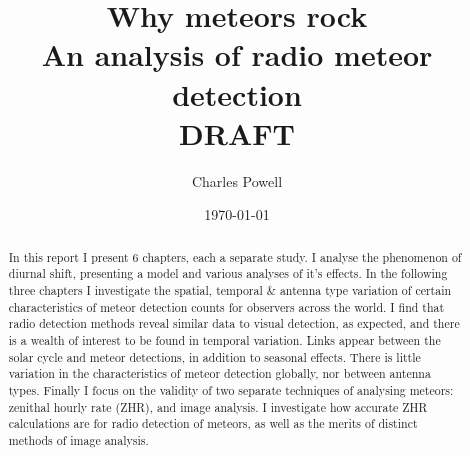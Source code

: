 \documentclass[a4paper,10pt,notitlepage, twocolumn]{report}
\title{\huge Why meteors rock \\ \large An analysis of radio meteor detection \\ \vspace{1em} \huge {\bf DRAFT}}
\author{Charles Powell}
\begin{document}
	

\begin{titlingpage}
\date{\today}
\maketitle

\vspace{10em}
\begin{abstract}
	In this report I present 6 chapters, each a separate study. I analyse the phenomenon of diurnal shift, presenting a model and various analyses of it's effects. In the following three chapters I investigate the spatial, temporal \& antenna type variation of certain characteristics of meteor detection counts for observers across the world. I find that radio detection methods reveal similar data to visual detection, as expected, and there is a wealth of interest to be found in temporal variation. Links appear between the solar cycle and meteor detections, in addition to seasonal effects. There is little variation in the characteristics of meteor detection globally, nor between antenna types. Finally I focus on the validity of two separate techniques of analysing meteors: zenithal hourly rate (ZHR), and image analysis. I investigate how accurate ZHR calculations are for radio detection of meteors, as well as the merits of distinct methods of image analysis. 
\end{abstract}
\end{titlingpage}

\tableofcontents










\onecolumn

\begin{appendices}

\end{appendices}
\printbibliography
\end{document}
